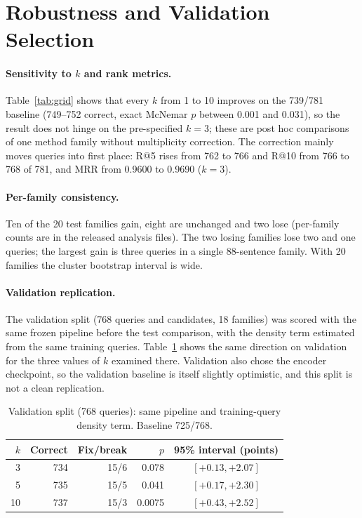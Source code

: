 \section{Robustness and Validation Selection}\label{sec:robust}
\paragraph{Sensitivity to $k$ and rank metrics.} Table~\ref{tab:grid} shows that every $k$ from 1 to 10 improves on the 739/781 baseline (749--752 correct, exact McNemar $p$ between 0.001 and 0.031), so the result does not hinge on the pre-specified $k=3$; these are post hoc comparisons of one method family without multiplicity correction. The correction mainly moves queries into first place: R@5 rises from 762 to 766 and R@10 from 766 to 768 of 781, and MRR from 0.9600 to 0.9690 ($k=3$).

\paragraph{Per-family consistency.} Ten of the 20 test families gain, eight are unchanged and two lose (per-family counts are in the released analysis files). The two losing families lose two and one queries; the largest gain is three queries in a single 88-sentence family. With 20 families the cluster bootstrap interval is wide.

\paragraph{Validation replication.} The validation split (768 queries and candidates, 18 families) was scored with the same frozen pipeline before the test comparison, with the density term estimated from the same training queries. Table~\ref{tab:valid} shows the same direction on validation for the three values of $k$ examined there. Validation also chose the encoder checkpoint, so the validation baseline is itself slightly optimistic, and this split is not a clean replication.

\begin{table}[t]
\centering\small
\caption{Validation split (768 queries): same pipeline and training-query density term. Baseline 725/768.}
\label{tab:valid}
\begin{tabular}{rrrrc}
\toprule
$k$ & Correct & Fix/break & $p$ & 95\% interval (points) \\
\midrule
3 & 734 & 15/6 & 0.078 & $[+0.13,+2.07]$ \\
5 & 735 & 15/5 & 0.041 & $[+0.17,+2.30]$ \\
10 & 737 & 15/3 & 0.0075 & $[+0.43,+2.52]$ \\
\bottomrule
\end{tabular}
\end{table}


